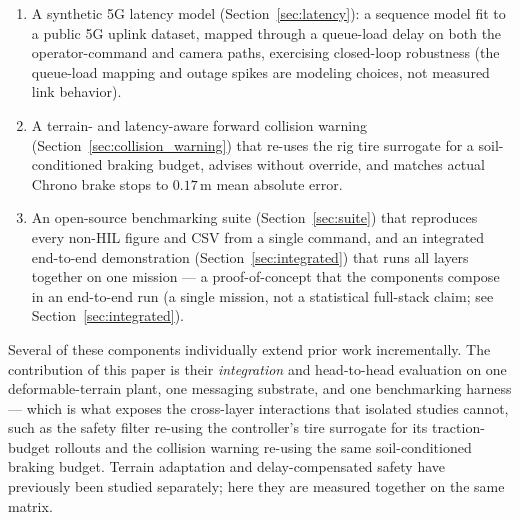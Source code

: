 \documentclass[conference,letterpaper,10pt]{IEEEtran}
\begin{document}
\begin{enumerate}
        (Section~\ref{sec:safety}) pairing in-horizon NMPC softplus
        barriers with a swappable downstream safety filter; the default
        instance is an intent-preserving DOB-CBF-QP inspired
        by~\cite{Zhang25}, with physical steering/throttle rate limits
        imposed directly in the QP. Its effect is quantified by a deterministic
        \emph{counterfactual replay} --- replaying a fixed command trace
        (filter off vs.\ on) on the identical scenario --- giving a
        paired, reproducible collision-prevention measurement over a
        scripted population of worst-case drive-into-hazard commands (a
        proxy for an inattentive or latency-overwhelmed operator).
  \item A synthetic 5G latency model (Section~\ref{sec:latency}): a
        sequence model fit to a public 5G uplink dataset, mapped through a
        queue-load delay on both the operator-command and camera paths,
        exercising closed-loop robustness (the queue-load mapping and outage
        spikes are modeling choices, not measured link behavior).
  \item A terrain- and latency-aware forward collision warning
        (Section~\ref{sec:collision_warning}) that re-uses the rig
        tire surrogate for a soil-conditioned braking budget, advises
        without override, and matches actual Chrono brake stops to
        $0.17\,\mathrm{m}$ mean absolute error.
  \item An open-source benchmarking suite
        (Section~\ref{sec:suite}) that reproduces every non-HIL
        figure and CSV from a single command, and an integrated
        end-to-end demonstration (Section~\ref{sec:integrated}) that runs
        all layers together on one mission --- a proof-of-concept that the
        components compose in an end-to-end run (a single mission, not a
        statistical full-stack claim; see Section~\ref{sec:integrated}).
\end{enumerate}

Several of these components individually extend prior work
incrementally. The contribution of this paper is their \emph{integration}
and head-to-head evaluation on one deformable-terrain plant, one
messaging substrate, and one benchmarking harness --- which is what
exposes the cross-layer interactions that isolated studies cannot, such
as the safety filter re-using the controller's tire surrogate for its
traction-budget rollouts and the collision warning re-using the same
soil-conditioned braking budget. Terrain adaptation and
delay-compensated safety have previously been studied separately; here
they are measured together on the same matrix.
\end{document}

